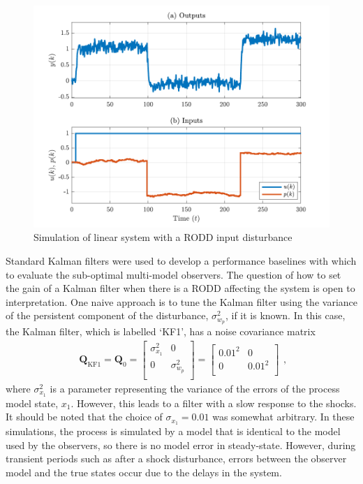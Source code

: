 \begin{figure}[htp]
	\centering
	\includegraphics[width=13cm]{images/rod_obs_sim1_ioplot.pdf}
	\caption{Simulation of linear system with a \gls{RODD} input disturbance}
	\label{fig:rod-obs-sim1-ioplot}
\end{figure}
Standard Kalman filters were used to develop a performance baselines with which to evaluate the sub-optimal multi-model observers. The question of how to set the gain of a Kalman filter when there is a \gls{RODD} affecting the system is open to interpretation. One naive approach is to tune the Kalman filter using the variance of the persistent component of the disturbance, $\sigma_{w_p}^2$, if it is known. In this case, the Kalman filter, which is labelled `KF1', has a noise covariance matrix
\begin{equation} \label{eq:sim-sys-siso-KF1-Q}
	\begin{aligned}
		\mathbf{Q}_{\text{KF1}}=\mathbf{Q}_0=\begin{bmatrix}
			\sigma_{x_1}^2 & 0 \\
			0 &  \sigma_{w_p}^2 \\
		\end{bmatrix}=\begin{bmatrix}
		0.01^2 & 0 \\
		0 & 0.01^2 \\
	\end{bmatrix}
	\end{aligned},
\end{equation}
where $\sigma_{x_1}^2$ is a parameter representing the variance of the errors of the process model state, $x_1$. However, this leads to a filter with a slow response to the shocks. It should be noted that the choice of $\sigma_{x_1}=0.01$ was somewhat arbitrary. In these simulations, the process is simulated by a model that is identical to the model used by the observers, so there is no model error in steady-state. However, during transient periods such as after a shock disturbance, errors between the observer model and the true states occur due to the delays in the system.

